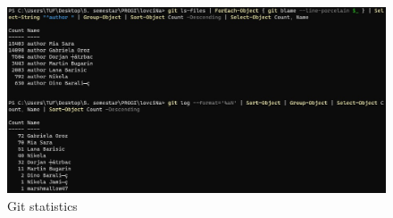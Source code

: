 		\begin{figure}[H]
			\includegraphics[scale=0.5]{slike/git_numbers.JPEG} %
			\centering
			\caption{Git statistics}
			\label{fig:contributors} %
		\end{figure}
		
		
	